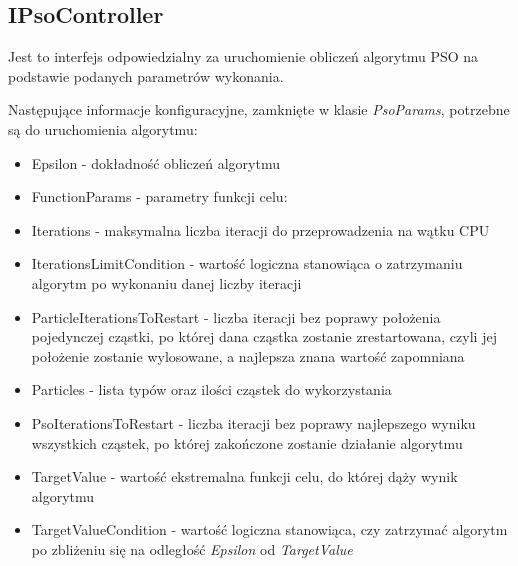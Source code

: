 \documentclass[12pt, twoside, openany, abstract=on]{report}
\theoremstyle{definition}
\begin{document}
\subsection{IPsoController}
Jest to interfejs odpowiedzialny za uruchomienie obliczeń algorytmu PSO na podstawie podanych parametrów wykonania.

Następujące informacje konfiguracyjne, zamknięte w klasie \emph{PsoParams}, potrzebne są do uruchomienia algorytmu:  

\begin{itemize}
	\item Epsilon - dokładność obliczeń algorytmu
	\item FunctionParams - parametry funkcji celu: 
	
	\item Iterations - maksymalna liczba iteracji do przeprowadzenia na wątku CPU
	\item IterationsLimitCondition - wartość logiczna stanowiąca o zatrzymaniu algorytm po wykonaniu danej liczby iteracji
	\item ParticleIterationsToRestart - liczba iteracji bez poprawy położenia pojedynczej cząstki, po której dana cząstka zostanie zrestartowana, czyli jej położenie zostanie wylosowane, a najlepsza znana wartość zapomniana
	\item Particles - lista typów oraz ilości cząstek do wykorzystania
	\item PsoIterationsToRestart - liczba iteracji bez poprawy najlepszego wyniku wszystkich cząstek, po której zakończone zostanie działanie algorytmu
	\item TargetValue - wartość ekstremalna funkcji celu, do której dąży wynik algorytmu
	\item TargetValueCondition - wartość logiczna stanowiąca, czy zatrzymać algorytm po zbliżeniu się na odległość \emph{Epsilon} od \emph{TargetValue}
\end{itemize}
\end{document}
